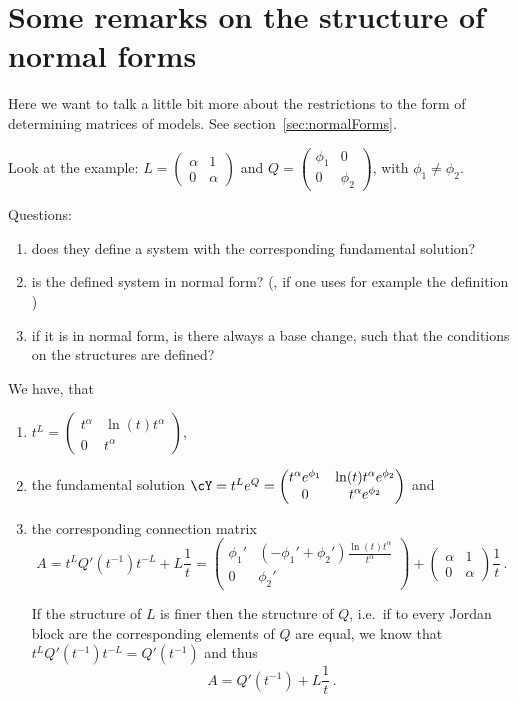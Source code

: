 \chapter{Some remarks on the structure of normal forms}
Here we want to talk a little bit more about the restrictions to the form of
determining matrices of models. See section~\ref{sec:normalForms}.

Look at the example: $L=\begin{pmatrix} \alpha & 1 \\ 0 & \alpha \end{pmatrix}$
and $Q=\begin{pmatrix} \phi_1 & 0 \\ 0 & \phi_2 \end{pmatrix}$, with
$\phi_1\neq\phi_2$.

Questions:
\begin{enumerate}
  \item does they define a system with the corresponding fundamental solution?
    \checkmark
  \item is the defined system in normal form?
    (\checkmark{}, if one uses for example the definition
    \cite[p.853]{Loday1994})
  \item if it is in normal form, is there always a base change, such that
    the conditions on the structures are defined?
\end{enumerate}
\begin{lem}
  We have, that 
  \begin{enumerate}
    \item $t^L=
      \begin{pmatrix}
        t^\alpha & \ln(t)t^\alpha \\ 0 & t^\alpha
      \end{pmatrix}$,
    \item the fundamental solution $\cY=t^Le^Q=
      \begin{pmatrix}
        t^\alpha e^{\phi_1} & \ln(t)t^\alpha e^{\phi_2}
        \\0 & t^\alpha e^{\phi_2}
      \end{pmatrix}$ and
    \item the corresponding connection matrix
      \[
        A=t^LQ'(t^{-1})t^{-L}+L\frac{1}{t}=
        \begin{pmatrix}
          \phi_1' & (-\phi_1'+\phi_2')\frac{\ln(t)t^\alpha}{t^\alpha}
          \\0 & \phi_2'
        \end{pmatrix} 
        +
        \begin{pmatrix} \alpha & 1 \\ 0 & \alpha \end{pmatrix} \frac{1}{t} \,.
      \]
      \begin{s-rem}
        If the structure of $L$ is finer then the structure of $Q$, i.e.\ if to
        every Jordan block are the corresponding elements of $Q$ are equal, we
        know that $t^LQ'(t^{-1})t^{-L}=Q'(t^{-1})$ and thus
        \[
          A=Q'(t^{-1})+L\frac{1}{t} \,.
        \]
      \end{s-rem}
  \end{enumerate}
\end{lem}
